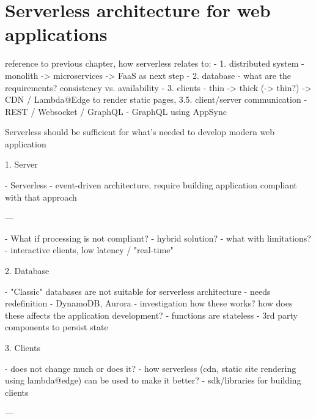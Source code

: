 \chapter{Serverless architecture for web applications}


reference to previous chapter, how serverless relates to:
- 1. distributed system - monolith -> microservices -> FaaS as next step
- 2. database - what are the requirements? consistency vs. availability
- 3. clients - thin -> thick (-> thin?) -> CDN / Lambda@Edge to render static pages, 3.5. client/server communication - REST / Websocket / GraphQL - GraphQL using AppSync

Serverless should be sufficient for what's needed to develop modern web application 

1. Server

- Serverless - event-driven architecture, require building application compliant with that approach

---

- What if processing is not compliant? - hybrid solution?
- what with limitations? - interactive clients, low latency / "real-time" 

2. Database

- "Classic" databases are not suitable for serverless architecture - needs redefinition - DynamoDB, Aurora - investigation how these works? how does these affects the application development?
- functions are stateless - 3rd party components to persist state

3. Clients 

- does not change much or does it?
- how serverless (cdn, static site rendering using lambda@edge) can be used to make it better?
- sdk/libraries for building clients

---

